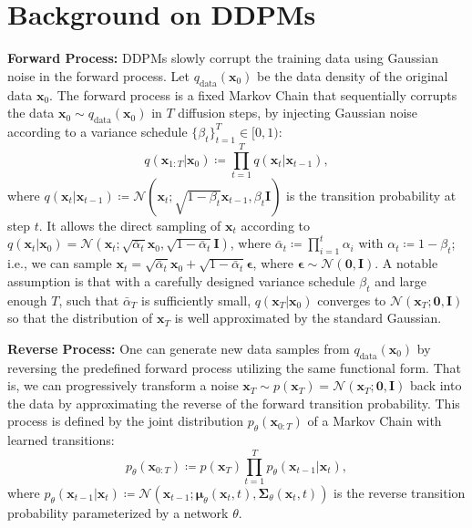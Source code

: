 \section{Background on DDPMs}

\noindent\textbf{Forward Process:}
DDPMs \citep{ho2020denoising,sohl2015deep} slowly corrupt the training data using Gaussian noise in the forward process. Let $q_{\text{data}}(\mathbf{x}_0)$ be the data density of the original data $\mathbf{x}_0$. The forward process is a fixed Markov Chain that sequentially corrupts
the data $\mathbf{x}_0 \sim q_{\text{data}}(\mathbf{x}_0)$ in $T$ diffusion steps, by injecting Gaussian noise according to a variance schedule $\{\beta_t\}_{t=1}^{T}\in[0,1)$:
\begin{equation}
    q(\mathbf{x}_{1:T}|\mathbf{x}_0)\coloneq\prod_{t=1}^Tq(\mathbf{x}_t|\mathbf{x}_{t-1}),
\label{eq: ddpm forward}
\end{equation}
where $q(\mathbf{x}_t|\mathbf{x}_{t-1})\coloneq\mathcal{N}(\mathbf{x}_t;\sqrt{1-\beta_t}\mathbf{x}_{t-1}, \beta_t\mathbf{I})$ is the transition probability at step $t$. It allows the direct sampling of $\mathbf{x}_t$ according to $q(\mathbf{x}_t|\mathbf{x}_0)=\mathcal{N}(\mathbf{x}_t;\sqrt{\bar{\alpha}_t}\mathbf{x}_0,\sqrt{1-\bar{\alpha}_t}\mathbf{I})$, where $\bar{\alpha}_t\coloneq\prod_{i=1}^t\alpha_i$ with $\alpha_t\coloneq 1-\beta_t$; i.e., we can sample $\mathbf{x}_t=\sqrt{\bar{\alpha}_t}\mathbf{x}_0+\sqrt{1-\bar{\alpha}_t}\boldsymbol{\epsilon}$, where $\boldsymbol{\epsilon}\sim\mathcal{N}(\mathbf{0},\mathbf{I})$. A notable assumption is that with a carefully designed variance schedule $\beta_t$ and large enough $T$, such that $\bar{\alpha}_T$ is sufficiently small, $q(\mathbf{x}_T|\mathbf{x}_0)$ converges to $\mathcal{N}(\mathbf{x}_T;\mathbf{0},\mathbf{I})$ so that the distribution of $\mathbf{x}_T$ is well approximated by the standard Gaussian.

\noindent\textbf{Reverse Process:}
One can generate new data samples from $q_{\text{data}}(\mathbf{x}_0)$ by reversing the predefined forward process utilizing the same functional form. That is, we can progressively transform a noise $\mathbf{x}_T\sim p(\mathbf{x}_T)=\mathcal{N}(\mathbf{x}_T; \mathbf{0}, \mathbf{I})$ back into the data by approximating the reverse of the forward transition probability. This process is defined by the joint distribution $p_\theta(\mathbf{x}_{0:T})$ of a Markov Chain with learned transitions:
\begin{equation}
    p_\theta(\mathbf{x}_{0:T})\coloneq p(\mathbf{x}_T)\prod_{t=1}^Tp_\theta(\mathbf{x}_{t-1}|\mathbf{x}_t),
\label{eq: ddpm reverse}
\end{equation}
where $p_\theta(\mathbf{x}_{t-1}|\mathbf{x}_t)\coloneq\mathcal{N}(\mathbf{x}_{t-1};\boldsymbol{\mu}_\theta(\mathbf{x}_t,t), \boldsymbol{\Sigma}_\theta(\mathbf{x}_t,t))$ is the reverse transition probability parameterized by a network $\theta$. 

